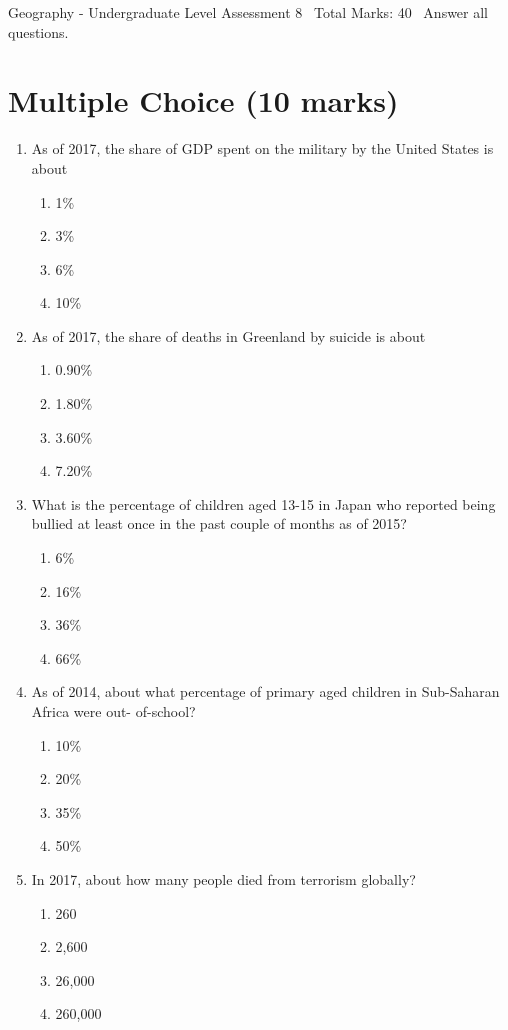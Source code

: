 \documentclass[12pt]{article}
\begin{document}
\begin{center}
Geography - Undergraduate Level Assessment 8 \
Total Marks: 40 \
Answer all questions.
\end{center}

\section*{Multiple Choice (10 marks)}
\begin{enumerate}[label=\arabic*.]
\item As of 2017, the share of GDP spent on the military by the United States is about
\begin{enumerate}[label=(\alph*)]
    \item 1\%
    \item 3\%
    \item 6\%
    \item 10\%
\end{enumerate}
\item As of 2017, the share of deaths in Greenland by suicide is about
\begin{enumerate}[label=(\alph*)]
    \item 0.90\%
    \item 1.80\%
    \item 3.60\%
    \item 7.20\%
\end{enumerate}
\item What is the percentage of children aged 13-15 in Japan who reported being bullied at least once in the past couple of months as of 2015?
\begin{enumerate}[label=(\alph*)]
    \item 6\%
    \item 16\%
    \item 36\%
    \item 66\%
\end{enumerate}
\item As of 2014, about what percentage of primary aged children in Sub-Saharan Africa were out- of-school?
\begin{enumerate}[label=(\alph*)]
    \item 10\%
    \item 20\%
    \item 35\%
    \item 50\%
\end{enumerate}
\item In 2017, about how many people died from terrorism globally?
\begin{enumerate}[label=(\alph*)]
    \item 260
    \item 2,600
    \item 26,000
    \item 260,000
\end{enumerate}
\end{enumerate}
\end{document}
